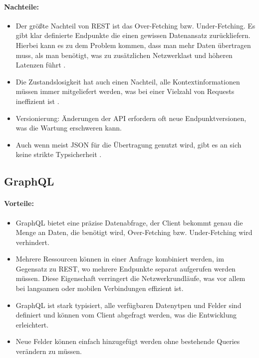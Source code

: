 \paragraph{Nachteile:}
\begin{itemize}
	\item Der größte Nachteil von REST ist das Over-Fetching bzw. Under-Fetching. Es gibt klar definierte Endpunkte die einen gewissen Datenansatz zurückliefern. Hierbei kann es zu dem Problem kommen, dass man mehr Daten übertragen muss, als man benötigt, was zu zusätzlichen Netzwerklast und höheren Latenzen führt \parencite{amazon2025graphql}.
	\item Die Zustandslosigkeit hat auch einen Nachteil, alle Kontextinformationen müssen immer mitgeliefert werden, was bei einer Vielzahl von Requests ineffizient ist \parencite{fielding2000rest}.
	\item Versionierung: Änderungen der API erfordern oft neue Endpunktversionen, was die Wartung erschweren kann.
	\item Auch wenn meist JSON für die Übertragung genutzt wird, gibt es an sich keine strikte Typsicherheit \parencite{redhat-apiguide}. 
\end{itemize}

\subsection{GraphQL}

\paragraph{Vorteile:}
\begin{itemize}
	\item GraphQL bietet eine präzise Datenabfrage, der Client bekommt genau die Menge an Daten, die benötigt wird, Over-Fetching bzw. Under-Fetching wird verhindert.
	\item Mehrere Ressourcen können in einer Anfrage kombiniert werden, im Gegensatz zu REST, wo mehrere Endpunkte separat aufgerufen werden müssen. Diese Eigenschaft verringert die Netzwerkrundläufe, was vor allem bei langsamen oder mobilen Verbindungen effizient ist.
	\item GraphQL ist stark typisiert, alle verfügbaren Datenytpen und Felder sind definiert und können vom Client abgefragt werden, was die Entwicklung erleichtert. 
	\item Neue Felder können einfach hinzugefügt werden ohne bestehende Queries verändern zu müssen.
\end{itemize}

